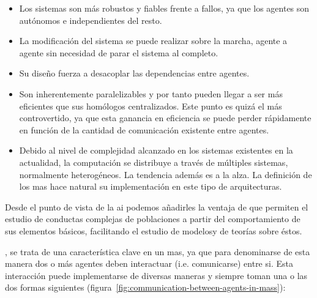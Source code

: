 \begin{itemize}
	\item Los sistemas son más robustos y fiables frente a fallos, ya que los agentes son autónomos e independientes del resto.
	\item La modificación del sistema se puede realizar sobre la marcha, agente a agente sin necesidad de parar el sistema al completo.
	\item Su diseño fuerza a desacoplar las dependencias entre agentes.
	\item Son inherentemente paralelizables y por tanto pueden llegar a ser más eficientes que sus homólogos centralizados. Este punto es quizá el más controvertido, ya que esta ganancia en eficiencia se puede perder rápidamente en función de la cantidad de comunicación existente entre agentes.
	\item Debido al nivel de complejidad alcanzado en los sistemas existentes en la actualidad, la computación se distribuye a través de múltiples sistemas, normalmente heterogéneos. La tendencia además es a la alza. La definición de los \gls{mas} hace natural su implementación en este tipo de arquitecturas.
\end{itemize}

Desde el punto de vista de la \gls{ai} podemos añadirles la ventaja de que permiten el estudio de conductas complejas de poblaciones a partir del comportamiento de sus elementos básicos, facilitando el estudio de modelosy de teorías sobre éstos.

, se trata de una característica clave en un \gls{mas}, ya que para denominarse de esta manera dos o más agentes deben interactuar (i.e. comunicarse) entre si. Esta interacción puede implementarse de diversas maneras y siempre toman una o las dos formas siguientes (figura~\ref{fig:communication-between-agents-in-mass}):

